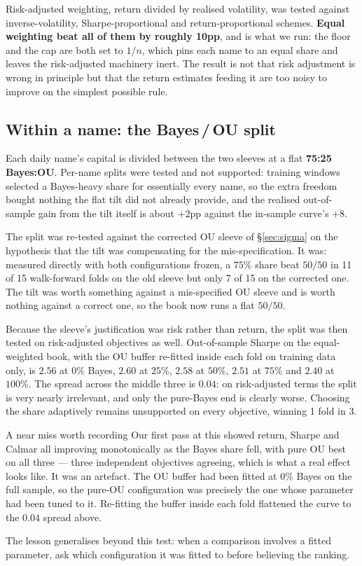 \documentclass[11pt]{article}
\begin{document}
Risk-adjusted weighting, return divided by realised volatility, was tested against
inverse-volatility, Sharpe-proportional and return-proportional schemes. \textbf{Equal weighting
beat all of them by roughly 10pp}, and is what we run: the floor and the cap are both set to
$1/n$, which pins each name to an equal share and leaves the risk-adjusted machinery inert. The
result is not that risk adjustment is wrong in principle but that the return estimates feeding it
are too noisy to improve on the simplest possible rule.

\subsection{Within a name: the Bayes\,/\,OU split}
Each daily name's capital is divided between the two sleeves at a flat \textbf{75:25
Bayes:OU}. Per-name splits were tested and not supported: training windows selected a
Bayes-heavy share for essentially every name, so the extra freedom bought nothing the flat tilt
did not already provide, and the realised out-of-sample gain from the tilt itself is about
$+2$pp against the in-sample curve's $+8$.

The split was re-tested against the corrected OU sleeve of \S\ref{sec:sigma} on the hypothesis
that the tilt was compensating for the mis-specification. It was: measured directly with both
configurations frozen, a $75\%$ share beat $50/50$ in 11 of 15 walk-forward folds on the old
sleeve but only 7 of 15 on the corrected one. The tilt was worth something against a
mis-specified OU sleeve and is worth nothing against a correct one, so the book now runs a flat
$50/50$.

Because the sleeve's justification was risk rather than return, the split was then tested on
risk-adjusted objectives as well. Out-of-sample Sharpe on the equal-weighted book, with the OU
buffer re-fitted inside each fold on training data only, is $2.56$ at $0\%$ Bayes, $2.60$ at
$25\%$, $2.58$ at $50\%$, $2.51$ at $75\%$ and $2.40$ at $100\%$. The spread across the middle
three is $0.04$: on risk-adjusted terms the split is very nearly irrelevant, and only the pure-Bayes
end is clearly worse. Choosing the share adaptively remains unsupported on every objective, winning
1 fold in 3.

\begin{keybox}{A near miss worth recording}
Our first pass at this showed return, Sharpe and Calmar all improving monotonically as the Bayes
share fell, with pure OU best on all three --- three independent objectives agreeing, which is
what a real effect looks like. It was an artefact. The OU buffer had been fitted at $0\%$ Bayes on
the full sample, so the pure-OU configuration was precisely the one whose parameter had been tuned
to it. Re-fitting the buffer inside each fold flattened the curve to the $0.04$ spread above.

The lesson generalises beyond this test: when a comparison involves a fitted parameter, ask which
configuration it was fitted to before believing the ranking.
\end{keybox}
\end{document}
